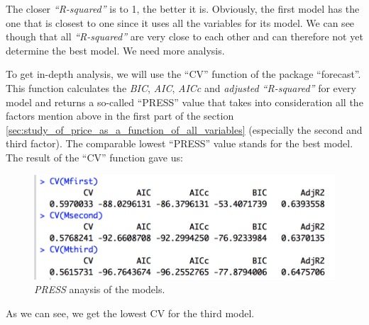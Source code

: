 The closer \emph{``R-squared''} is to 1, the better it is. Obviously, the 
first model has the one that is closest to one since it uses all the variables for its model. We can see though that all \emph{``R-squared''} are very close to each other and can therefore not yet determine the 
best model. We need more analysis. 

To get in-depth analysis, we will use the ``CV'' function of the package ``forecast''. This function calculates the \emph{BIC}, \emph{AIC}, \emph{AICc} and \emph{adjusted ``R-squared''} for every model and returns 
a so-called ``PRESS'' value that takes into consideration all the factors mention above in the first part of the section \ref{sec:study_of_price_as_a_function_of_all_variables} (especially the second and third factor). The comparable lowest ``PRESS'' value stands for 
the best model. The result of the ``CV'' function gave us:

\begin{figure}[H]
  \begin{center}
    \includegraphics[scale=0.7]{./img/CV_analysis.png}
    \end{center}
  \caption{\textit{PRESS} anaysis of the models.}
  \label{fig:Scatter}
\end{figure}

As we can see, we get the lowest CV for the third model.



